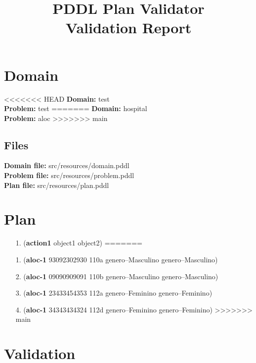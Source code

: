 \documentclass{article}
\title{\textbf{PDDL Plan Validator}\\Validation Report}
\date{} %
\begin{document}
\maketitle

\section{Domain}
<<<<<<< HEAD
\textbf{Domain:}  test\\
\textbf{Problem:} test
=======
\textbf{Domain:}  hospital\\
\textbf{Problem:} aloc
>>>>>>> main

\subsection{Files}
\textbf{Domain file:}  src/resources/domain.pddl \\
\textbf{Problem file:} src/resources/problem.pddl\\
\textbf{Plan file:}    src/resources/plan.pddl

\section{Plan}

\begin{itemize}
<<<<<<< HEAD
    \item[1.] (\textbf{action1} object1 object2)
=======
    \item[1.] (\textbf{aloc-1} 93092302930 110a genero--Masculino genero--Masculino)
    \item[2.] (\textbf{aloc-1} 09090909091 110b genero--Masculino genero--Masculino)
    \item[3.] (\textbf{aloc-1} 23433454353 112a genero--Feminino genero--Feminino)
    \item[4.] (\textbf{aloc-1} 34343434324 112d genero--Feminino genero--Feminino)
>>>>>>> main
\end{itemize}

\section{Validation}
\end{document}
